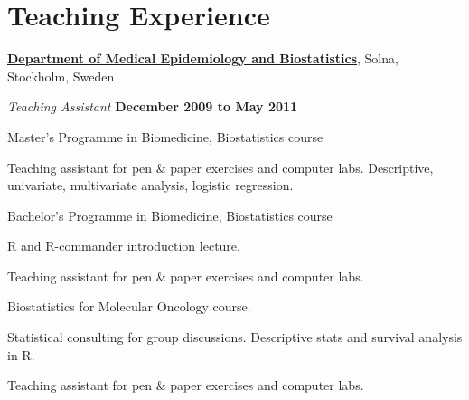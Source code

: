 %
%

%
%
\section{Teaching Experience}
\href{http://ki.se/ki/jsp/polopoly.jsp?d=9600}{\textbf{Department of Medical Epidemiology and Biostatistics}}, Solna, Stockholm, Sweden
\begin{outerlist}
\item[] \textit{Teaching Assistant}
  \hfill \textbf{December 2009 to May 2011}
  \begin{innerlist}

  \item Master's Programme in Biomedicine, Biostatistics course
    \begin{innerlist}
    \item Teaching assistant for pen \& paper exercises and computer labs. Descriptive, univariate, multivariate analysis, logistic regression.
    \end{innerlist}

    \halfblankline

  \item Bachelor's Programme in Biomedicine, Biostatistics course
    \begin{innerlist}
    \item R and R-commander introduction lecture.
    \item Teaching assistant for pen \& paper exercises and computer labs.
    \end{innerlist}

    \halfblankline

  \item Biostatistics for Molecular Oncology course.
    \begin{innerlist}
    \item Statistical consulting for group discussions. Descriptive stats and survival analysis in R.
    \item Teaching assistant for pen \& paper exercises and computer labs.
    \end{innerlist}

  \end{innerlist}
\end{outerlist}

